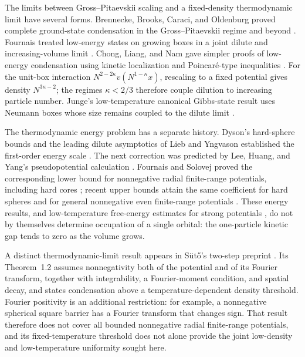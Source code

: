 The limits between Gross--Pitaevskii scaling and a fixed-density
thermodynamic limit have several forms. Brennecke, Brooks, Caraci, and
Oldenburg proved complete ground-state condensation in the
Gross--Pitaevskii regime and beyond
\cite{BrenneckeBrooksCaraciOldenburg2025}. Fournais treated low-energy
states on growing boxes in a joint dilute and increasing-volume limit
\cite[Theorem~1.2]{Fournais2021}. Chong, Liang, and Nam gave simpler
proofs of low-energy condensation using kinetic localization and
Poincar\'e-type inequalities \cite{ChongLiangNam2026}.
For the unit-box interaction $N^{2-2\kappa}v(N^{1-\kappa}x)$,
rescaling to a fixed potential gives density $N^{3\kappa-2}$;
the regimes $\kappa<2/3$ therefore couple dilution to increasing
particle number. Junge's low-temperature canonical Gibbs-state
result uses Neumann boxes whose size remains coupled to
the dilute limit \cite[Corollary~6]{Junge2026Propagation}.

The thermodynamic energy problem has a separate history. Dyson's
hard-sphere bounds and the leading dilute asymptotics of Lieb and
Yngvason established the first-order energy scale
\cite{Dyson1957,LiebYngvason1998}. The next correction was predicted
by Lee, Huang, and Yang's pseudopotential calculation
\cite{LeeHuangYang1957}. Fournais and Solovej proved the corresponding
lower bound for nonnegative radial finite-range potentials, including hard cores
\cite[Theorems~1.1 and~1.3]{FournaisSolovej2023}; recent upper bounds
attain the same coefficient for hard spheres and for general
nonnegative even finite-range potentials
\cite{BastiEtAl2026HardSpheres,BastiEtAl2026GeneralPotentials}.
These energy results, and low-temperature free-energy estimates for
strong potentials \cite{FournaisEtAl2026StrongFreeEnergy}, do not by
themselves determine occupation of a single orbital: the one-particle
kinetic gap tends to zero as the volume grows.

A distinct thermodynamic-limit result appears in S\"ut\H{o}'s two-step preprint
\cite{Suto2023TwoStep}. Its Theorem~1.2 assumes nonnegativity both of the
potential and of its Fourier transform, together with integrability,
a Fourier-moment condition, and spatial decay, and states condensation
above a temperature-dependent density threshold. Fourier positivity is
an additional restriction: for example, a nonnegative spherical square
barrier has a Fourier transform that changes sign. That result therefore
does not cover all bounded nonnegative radial finite-range potentials,
and its fixed-temperature threshold does not alone provide the joint
low-density and low-temperature uniformity sought here.

